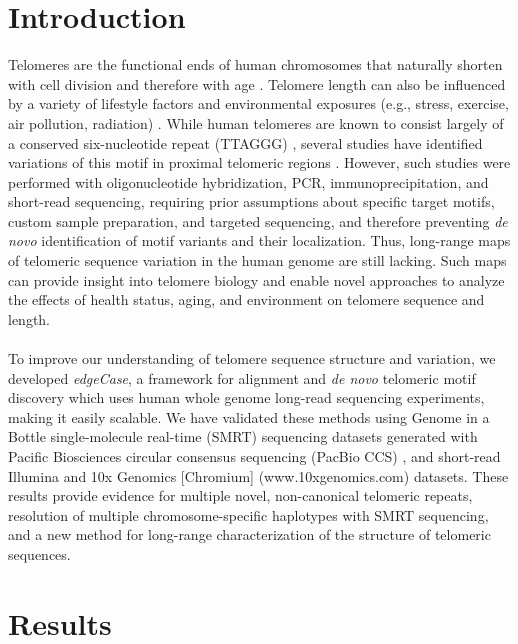\documentclass{article}
\begin{document}
\section*{Introduction} 
    Telomeres are the functional ends of human chromosomes that naturally shorten with cell division and therefore with age \parencite{teloaging}.
    Telomere length can also be influenced by a variety of lifestyle factors and environmental exposures
        (e.g., stress, exercise, air pollution, radiation) \parencite{teloeffects}.
    While human telomeres are known to consist largely of a conserved six-nucleotide repeat (TTAGGG) \parencite{moyzis},
        several studies have identified variations of this motif in proximal telomeric regions
            \parencite{telovars1989,telovars1999,telovars2018,telovars2019}.
    However, such studies were performed with oligonucleotide hybridization, PCR, immunoprecipitation, and short-read sequencing,
        requiring prior assumptions about specific target motifs, custom sample preparation, and targeted sequencing,
        and therefore preventing \textit{de novo} identification of motif variants and their localization.
    Thus, long-range maps of telomeric sequence variation in the human genome are still lacking.
    Such maps can provide insight into telomere biology and enable novel approaches to analyze the effects of
        health status, aging, and environment on telomere sequence and length.
    \\~\\
    To improve our understanding of telomere sequence structure and variation, we developed \textit{edgeCase},
        a framework for alignment and \textit{de novo} telomeric motif discovery
        which uses human whole genome long-read sequencing experiments,
            making it easily scalable.
    We have validated these methods using
        Genome in a Bottle \parencite{giab} single-molecule real-time (SMRT) sequencing datasets
            generated with Pacific Biosciences circular consensus sequencing (PacBio CCS) \parencite{pacbio,pacbioccs},
        and short-read Illumina \parencite{illumina} and 10x Genomics [Chromium] (www.10xgenomics.com) datasets.
    These results provide evidence for
        multiple novel, non-canonical telomeric repeats,
        resolution of multiple chromosome-specific haplotypes with SMRT sequencing,
        and a new method for long-range characterization of the structure of telomeric sequences.

\section*{Results} 
\end{document}
